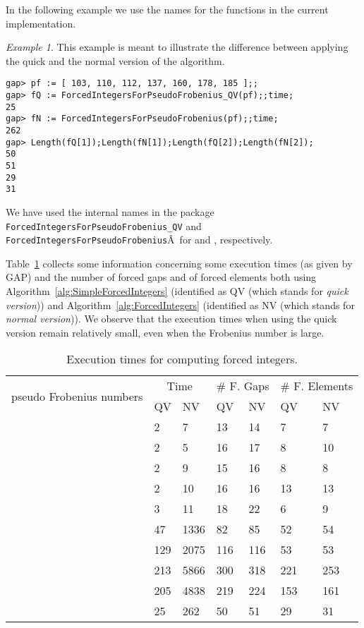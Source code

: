 \documentclass[11pt]{amsart}
\theoremstyle{remark}
\newtheorem{example}[theorem]{Example}
\begin{document}
In the following example we use the names for the functions in the current implementation.
\begin{example}
This example is meant to illustrate the difference between applying the quick and the normal version of the algorithm. 
\begin{verbatim}
gap> pf := [ 103, 110, 112, 137, 160, 178, 185 ];;              
gap> fQ := ForcedIntegersForPseudoFrobenius_QV(pf);;time;       
25
gap> fN := ForcedIntegersForPseudoFrobenius(pf);;time;          
262
gap> Length(fQ[1]);Length(fN[1]);Length(fQ[2]);Length(fN[2]);   
50
51
29
31
\end{verbatim}
We have used the internal names in the package \texttt{ForcedIntegersForPseudoFrobenius\_QV} and \texttt{Forced\-Integers\-For\-PseudoFrobenius}Â for \ForcedIntegersQV and \ForcedIntegers, respectively.

\end{example}
Table~\ref{fig:execution_time_forced_integers} collects some information concerning some execution times (as given by \textsf{GAP}) and the number of forced gaps and of forced elements both using Algorithm~\ref{alg:SimpleForcedIntegers} (identified as QV (which stands for \emph{quick version})) and Algorithm~\ref{alg:ForcedIntegers} (identified as NV (which stands for \emph{normal version})).
We observe that the execution times when using the quick version remain relatively small, even when the Frobenius number is large.

\begin{table}
\begin{center}
    \begin{tabular}{| l | l | l | l | l | l | l |}
    \hline
\multirow{2}{*}{pseudo Frobenius numbers}&\multicolumn{2}{|c|}{Time}&\multicolumn{2}{|c|}{\# F. Gaps}&\multicolumn{2}{|c|}{\# F. Elements}\\ \cline{2-7}
                          &QV & NV            & QV & NV                     &QV & NV           \\ \hline
[ 11, 22, 23, 25 ]&2&7&13&14&7&7\\ \hline
[ 17, 27, 28, 29 ]   &   2&5&16&17&8&10\\ \hline
[ 17, 19, 21, 25, 27 ]&2&9&15&16&8&8\\ \hline
[ 15, 20, 27, 35 ]&2&10&16&16&13&13\\ \hline
[ 12, 24, 25, 26, 28, 29 ]&3&11&18&22&6&9\\ \hline
[ 145, 154, 205, 322, 376, 380 ]&47&1336&82&85&52&54\\ \hline
[ 245, 281, 282, 292, 334, 373, 393, 424, 432, 454, 467 ]&129&2075&116&116&53&53\\ \hline
[ 223, 434, 476, 513, 549, 728, 828, 838, 849, 953 ]&213&5866&300&318&221&253\\ \hline
[ 219, 437, 600, 638, 683, 779, 801, 819, 880 ]&205&4838&219&224&153&161\\ \hline
[ 103, 110, 112, 137, 160, 178, 185 ]&25&262&50&51&29&31\\ \hline
    \end{tabular}
\end{center}
\caption{Execution times for computing forced integers.\label{fig:execution_time_forced_integers}}
\end{table}
\end{document}
